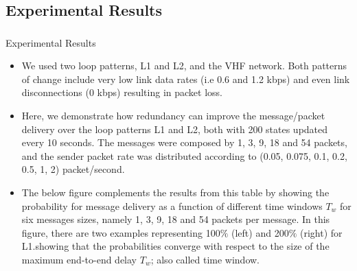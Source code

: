 \documentclass{beamer}
\begin{document}
\begin{frame}[fragile]
\section{Experimental Results}
\frametitle{}
\begin{block}{Experimental Results}
\begin{itemize}
    \item We used two loop patterns, L1 and L2, and the VHF network. Both patterns of change include very low link data rates (i.e 0.6 and 1.2 kbps) and even link disconnections (0 kbps) resulting in packet loss. 
    \item Here, we demonstrate how redundancy can improve the message/packet delivery over the loop patterns L1  and L2, both with 200 states updated every 10 seconds. The messages were composed by 1, 3, 9, 18 and 54 packets, and the sender packet rate was distributed according to (0.05, 0.075, 0.1, 0.2, 0.5, 1, 2) packet/second.
    \item The below figure complements the results from this table by showing the probability for message delivery as a function of different time windows $T_{w}$ for six messages sizes, namely 1, 3, 9, 18 and 54 packets per message. In this figure, there are two examples representing 100$\%$ (left) and 200$\%$ (right) for L1.showing that the probabilities converge with respect to the size of the maximum end-to-end delay $T_{w}$; also called time window.
\end{itemize}
\end{block}
\end{frame}
\end{document}
